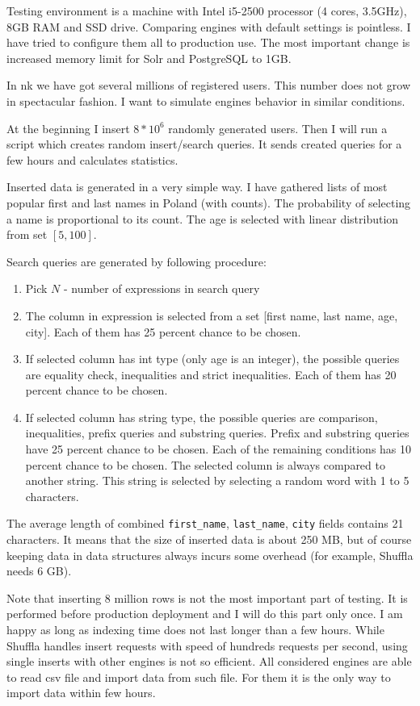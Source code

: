 \documentclass[10pt,a4paper]{article}
\begin{document}
Testing environment is a machine with Intel i5-2500 processor (4 cores, 3.5GHz), 8GB RAM and SSD drive. Comparing engines with default settings is pointless. I have tried to configure them all to production use. The most important change is increased memory limit for Solr and PostgreSQL to 1GB.

In nk we have got several millions of registered users. This number does not grow in spectacular fashion. I want to simulate engines behavior in similar conditions. 

At the beginning I insert $8 * 10^6$ randomly generated users. Then I will run a script which creates random insert/search queries. It sends created queries for a few hours and calculates statistics.

Inserted data is generated in a very simple way. I have gathered lists of most popular first and last names in Poland (with counts). The probability of selecting a name is proportional to its count. The age is selected with linear distribution from set $[5, 100]$. 

Search queries are generated by following procedure:
\begin{enumerate}
\item Pick $N$ - number of expressions in search query
\item The column in expression is selected from a set [first name, last name, age, city]. Each of them has 25 percent chance to be chosen.
\item If selected column has int type (only age is an integer), the possible queries are equality check, inequalities and strict inequalities. Each of them has 20 percent chance to be chosen.
\item If selected column has string type, the possible queries are comparison, inequalities, prefix queries and substring queries. Prefix and substring queries have 25 percent chance to be chosen. Each of the remaining conditions has 10 percent chance to be chosen. The selected column is always compared to another string. This string is selected by selecting a random word with 1 to 5 characters.
\end{enumerate}
The average length of combined \verb|first_name|, \verb|last_name|, \verb|city| fields contains 21 characters. It means that the size of inserted data is about 250 MB, but of course keeping data in data structures always incurs some overhead (for example, Shuffla needs 6 GB).

Note that inserting 8 million rows is not the most important part of testing. It is performed before production deployment and I will do this part only once. I am happy as long as indexing time does not last longer than a few hours. While Shuffla handles insert requests with speed of hundreds requests per second, using single inserts with other engines is not so efficient. All considered engines are able to read csv file and import data from such file. For them it is the only way to import data within few hours.
\end{document}
